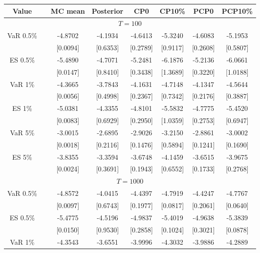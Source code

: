 { \renewcommand{\arraystretch}{1.2} 
{\footnotesize 
\begin{table} 
\center 
\begin{tabular}{cc cccccc} 
Value & & MC mean & Posterior & CP0  & CP10\% & PCP0  & PCP10\% \\ \hline 
\hline 
\multicolumn{8}{c}{$T =100$}  \\ 
\hline 
\rowcolor{LightCyan} 
VaR 0.5\% && -4.8702 & -4.1934 & -4.6413 & -5.3240 & -4.6083 & -5.1953 \\ 
  && [0.0094] & [0.6353] & [0.2789] & [0.9117] & [0.2608] & [0.5807] \\ 
\rowcolor{LightCyan} 
ES 0.5\% && -5.4890 & -4.7071 & -5.2481 & -6.1876 & -5.2136 & -6.0661 \\ 
  && [0.0147] & [0.8410] & [0.3438] & [1.3689] & [0.3220] & [1.0188] \\ [1ex]
\rowcolor{LightCyan} 
VaR 1\% && -4.3665 & -3.7843 & -4.1631 & -4.7148 & -4.1347 & -4.5644 \\ 
  && [0.0056] & [0.4998] & [0.2367] & [0.7342] & [0.2176] & [0.3887] \\ 
\rowcolor{LightCyan} 
ES 1\% && -5.0381 & -4.3355 & -4.8101 & -5.5832 & -4.7775 & -5.4520 \\ 
  && [0.0083] & [0.6929] & [0.2950] & [1.0359] & [0.2753] & [0.6947] \\ [1ex]
\rowcolor{LightCyan} 
VaR 5\% && -3.0015 & -2.6895 & -2.9026 & -3.2150 & -2.8861 & -3.0002 \\ 
 && [0.0018] & [0.2116] & [0.1476] & [0.5894] & [0.1241] & [0.1690] \\ 
\rowcolor{LightCyan} 
ES 5\% && -3.8355 & -3.3594 & -3.6748 & -4.1459 & -3.6515 & -3.9675 \\ 
 && [0.0024] & [0.3691] & [0.1943] & [0.6552] & [0.1733] & [0.2768] \\ 
\hline 
\multicolumn{8}{c}{$T =1000$}  \\ 
\hline 
\rowcolor{LightCyan} 
VaR 0.5\% && -4.8572 & -4.0415 & -4.4397 & -4.7919 & -4.4247 & -4.7767 \\ 
  && [0.0097] & [0.6743] & [0.1977] & [0.0817] & [0.2061] & [0.0640] \\ 
\rowcolor{LightCyan} 
ES 0.5\% && -5.4775 & -4.5196 & -4.9837 & -5.4019 & -4.9638 & -5.3839 \\ 
  && [0.0150] & [0.9530] & [0.2858] & [0.1024] & [0.3021] & [0.0878] \\ [1ex]
\rowcolor{LightCyan} 
VaR 1\% && -4.3543 & -3.6551 & -3.9996 & -4.3032 & -3.9886 & -4.2889 \\ 

\end{tabular}
\end{table}}}
